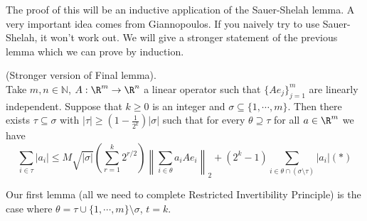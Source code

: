 
%
%

The proof of this will be an inductive application of the Sauer-Shelah lemma. A very important idea comes from Giannopoulos. If you naively try to use Sauer-Shelah, it won't work out. We will give a stronger statement of the previous lemma which we can prove by induction. 

\begin{lem}  (Stronger version of Final lemma). \\
Take $m, n \in \mathbb{N}$, $A: \R^m \to \R^n$ a linear operator such that $\{Ae_j\}_{j = 1}^m$ are linearly independent. Suppose that $k \geq 0$ is an integer and $\sigma \subseteq \{1, \cdots, m\}$. Then there exists $\tau \subseteq \sigma$ with $|\tau| \geq (1 - \frac{1}{2^k})|\sigma|$ such that for every $\theta \supseteq \tau$ for all $a \in \R^m$ we have
\[
 \sum_{i \in \tau} |a_i| \leq M\sqrt{|\sigma|}\left(\sum_{r = 1}^k 2^{r/2}\right)\left\|\sum_{i \in \theta} a_i Ae_i\right\|_2 + (2^k - 1)\sum_{i \in \theta \cap (\sigma \setminus \tau)} |a_i|       (*)
\]
\end{lem}

Our first lemma (all we need to complete Restricted Invertibility Principle) is the case where $\theta = \tau \cup \{1, \cdots, m\}\setminus \sigma$, $t = k$. 

